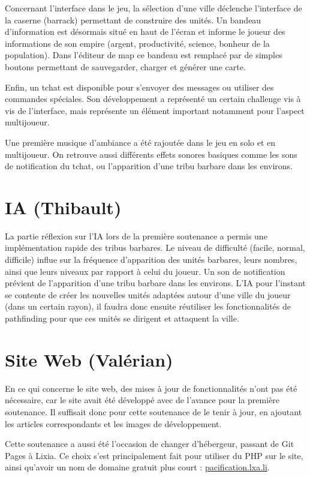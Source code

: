 \documentclass[12pt]{report}
\begin{document}
Concernant l'interface dans le jeu, la sélection d'une ville déclenche
l'interface de la caserne (barrack) permettant de construire des unités. Un
bandeau d'information est désormais situé en haut de l'écran et informe le
joueur des informations de son empire (argent, productivité, science, bonheur
de la population). Dans l'éditeur de map ce bandeau est remplacé par de simples
boutons permettant de sauvegarder, charger et générer une carte.

Enfin, un tchat est disponible pour s'envoyer des messages ou utiliser des
commandes spéciales. Son développement a représenté un certain challenge vis à
vis de l'interface, mais représente un élément important notamment pour
l'aspect multijoueur.

Une première musique d'ambiance a été rajoutée dans le jeu en solo et en
multijoueur. On retrouve aussi différents effets sonores basiques comme les
sons de notification du tchat, ou l'apparition d'une tribu barbare dans les
environs.

\section{IA (Thibault)}

La partie réflexion sur l'IA lors de la première soutenance a permis une
implémentation rapide des tribus barbares. Le niveau de difficulté (facile,
normal, difficile) influe sur la fréquence d'apparition des unités barbares,
leurs nombres, ainsi que leurs niveaux par rapport à celui du joueur. Un son de
notification prévient de l'apparition d'une tribu barbare dans les environs.
L'IA pour l'instant se contente de créer les nouvelles unités adaptées autour
d'une ville du joueur (dans un certain rayon), il faudra donc ensuite réutiliser
les fonctionnalités de pathfinding pour que ces unités se dirigent et attaquent
la ville.

\section{Site Web (Valérian)}

En ce qui concerne le site web, des mises à jour de fonctionnalités n’ont pas
été nécessaire, car le site avait été développé avec de l’avance pour la
première soutenance. Il suffisait donc pour cette soutenance de le tenir à
jour, en ajoutant les articles correspondants et les images de développement.

Cette soutenance a aussi été l’occasion de changer d'hébergeur, passant de Git
Pages à Lixia. Ce choix s’est principalement fait pour utiliser du PHP sur le
site, ainsi qu'avoir un nom de domaine gratuit plus court :
\url{pacification.lxa.li}.
\end{document}
